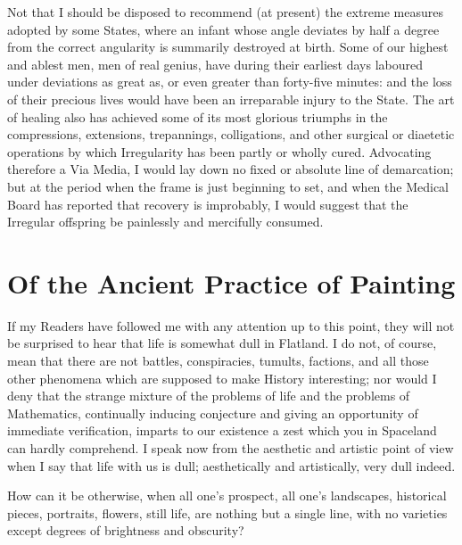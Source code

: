 \documentclass[12pt, a4paper, twoside]{memoir}
\begin{document}
Not that I should be disposed to recommend (at present) the extreme measures
adopted by some States, where an infant whose angle deviates by half a degree
from the correct angularity is summarily destroyed at birth.  Some of our
highest and ablest men, men of real genius, have during their earliest days
laboured under deviations as great as, or even greater than forty-five
minutes: and the loss of their precious lives would have been an irreparable
injury to the State. The art of healing also has achieved some of its most
glorious triumphs in the compressions, extensions, trepannings, colligations,
and other surgical or diaetetic operations by which Irregularity has been
partly or wholly cured. Advocating therefore a Via Media, I would lay down no
fixed or absolute line of demarcation; but at the period when the frame is
just beginning to set, and when the Medical Board has reported that recovery
is improbably, I would suggest that the Irregular offspring be painlessly and
mercifully consumed.






\chapter{Of the Ancient Practice of Painting}
If my Readers have followed me with any attention up to this point, they will
not be surprised to hear that life is somewhat dull in Flatland. I do not, of
course, mean that there are not battles, conspiracies, tumults, factions, and
all those other phenomena which are supposed to make History interesting; nor
would I deny that the strange mixture of the problems of life and the problems
of Mathematics, continually inducing conjecture and giving an opportunity of
immediate verification, imparts to our existence a zest which you in Spaceland
can hardly comprehend. I speak now from the aesthetic and artistic point of
view when I say that life with us is dull; aesthetically and artistically,
very dull indeed.

How can it be otherwise, when all one's prospect, all one's landscapes,
historical pieces, portraits, flowers, still life, are nothing but a single
line, with no varieties except degrees of brightness and obscurity?
\end{document}
